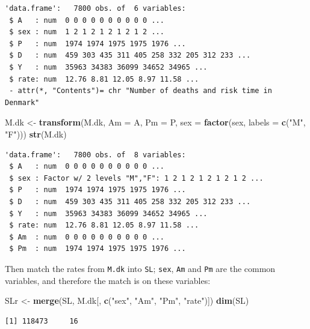 \documentclass[
]{book}
\newenvironment{Shaded}{\begin{snugshade}}{\end{snugshade}}
\newcommand{\AttributeTok}[1]{\textcolor[rgb]{0.13,0.29,0.53}{#1}}
\newcommand{\FunctionTok}[1]{\textcolor[rgb]{0.13,0.29,0.53}{\textbf{#1}}}
\newcommand{\NormalTok}[1]{#1}
\newcommand{\OtherTok}[1]{\textcolor[rgb]{0.56,0.35,0.01}{#1}}
\newcommand{\StringTok}[1]{\textcolor[rgb]{0.31,0.60,0.02}{#1}}
\begin{document}
\begin{enumerate}
\begin{verbatim}
'data.frame':   7800 obs. of  6 variables:
 $ A   : num  0 0 0 0 0 0 0 0 0 0 ...
 $ sex : num  1 2 1 2 1 2 1 2 1 2 ...
 $ P   : num  1974 1974 1975 1975 1976 ...
 $ D   : num  459 303 435 311 405 258 332 205 312 233 ...
 $ Y   : num  35963 34383 36099 34652 34965 ...
 $ rate: num  12.76 8.81 12.05 8.97 11.58 ...
 - attr(*, "Contents")= chr "Number of deaths and risk time in Denmark"
\end{verbatim}

\begin{Shaded}
\begin{Highlighting}[]
\NormalTok{M.dk }\OtherTok{\textless{}{-}} \FunctionTok{transform}\NormalTok{(M.dk,}
                  \AttributeTok{Am =}\NormalTok{ A,}
                  \AttributeTok{Pm =}\NormalTok{ P,}
                 \AttributeTok{sex =} \FunctionTok{factor}\NormalTok{(sex, }\AttributeTok{labels =} \FunctionTok{c}\NormalTok{(}\StringTok{"M"}\NormalTok{, }\StringTok{"F"}\NormalTok{)))}
\FunctionTok{str}\NormalTok{(M.dk)}
\end{Highlighting}
\end{Shaded}

\begin{verbatim}
'data.frame':   7800 obs. of  8 variables:
 $ A   : num  0 0 0 0 0 0 0 0 0 0 ...
 $ sex : Factor w/ 2 levels "M","F": 1 2 1 2 1 2 1 2 1 2 ...
 $ P   : num  1974 1974 1975 1975 1976 ...
 $ D   : num  459 303 435 311 405 258 332 205 312 233 ...
 $ Y   : num  35963 34383 36099 34652 34965 ...
 $ rate: num  12.76 8.81 12.05 8.97 11.58 ...
 $ Am  : num  0 0 0 0 0 0 0 0 0 0 ...
 $ Pm  : num  1974 1974 1975 1975 1976 ...
\end{verbatim}

  Then match the rates from \texttt{M.dk} into \texttt{SL};
  \texttt{sex}, \texttt{Am} and \texttt{Pm} are the common variables,
  and therefore the match is on these variables:

\begin{Shaded}
\begin{Highlighting}[]
\NormalTok{SLr }\OtherTok{\textless{}{-}} \FunctionTok{merge}\NormalTok{(SL, }
\NormalTok{             M.dk[, }\FunctionTok{c}\NormalTok{(}\StringTok{"sex"}\NormalTok{, }\StringTok{"Am"}\NormalTok{, }\StringTok{"Pm"}\NormalTok{, }\StringTok{"rate"}\NormalTok{)])}
\FunctionTok{dim}\NormalTok{(SL)}
\end{Highlighting}
\end{Shaded}

\begin{verbatim}
[1] 118473     16
\end{verbatim}


\end{enumerate}
\end{document}
